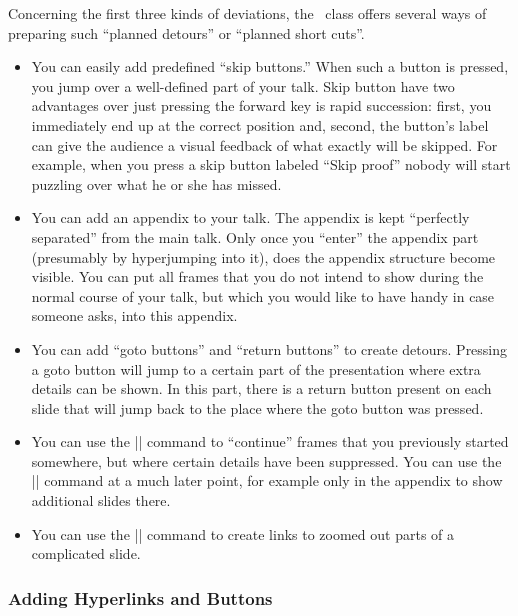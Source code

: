 Concerning the first three kinds of deviations, the \beamer\ class
offers several ways of preparing such ``planned detours'' or ``planned
short cuts''.
\begin{itemize}
\item
  You can easily add predefined ``skip buttons.'' When such a button
  is pressed, you jump over a well-defined part of your talk. Skip
  button have two advantages over just pressing the forward key
  is rapid succession: first, you immediately end up at the correct
  position and, second, the button's label can give the audience a
  visual feedback of what exactly will be skipped. For example, when
  you press a skip button labeled ``Skip proof'' nobody will start
  puzzling over what he or she has missed.
\item
  You can add an appendix to your talk. The appendix is kept
  ``perfectly separated'' from the main talk. Only once you ``enter''
  the appendix part (presumably by hyperjumping into it), does the
  appendix structure become visible. You can put all frames that you
  do not intend to show during the normal course of your talk, but
  which you would like to have handy in case someone asks, into this
  appendix.
\item
  You can add ``goto buttons'' and ``return buttons'' to create
  detours. Pressing a goto button will jump to a certain part of the
  presentation where extra details can be shown. In this part, there
  is a return button present on each slide that will jump back to the
  place where the goto button was pressed.
\item
  You can use the |\againframe| command to ``continue'' frames that
  you previously started somewhere, but where certain details have
  been suppressed. You can use the |\againframe| command at a
  much later point, for example only in the appendix to show
  additional slides there.
\item
  You can use the |\framezoom| command to create links to zoomed out
  parts of a complicated slide.
\end{itemize}




\subsubsection{Adding Hyperlinks and Buttons}

